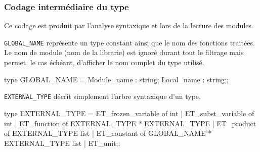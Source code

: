 \subsubsection{Codage interm{\'e}diaire du type}

Ce codage est produit par l'analyse syntaxique et lors de la lecture
des modules.

\verb$GLOBAL_NAME$ repr{\'e}sente un type constant ainsi que
le nom des fonctions trait{\'e}es. Le nom de module (nom de la librarie)
est ignor{\'e} durant tout le filtrage mais permet, le cas {\'e}ch{\'e}ant,
d'afficher le nom complet du type utilis{\'e}.

\begin{caml_code}
type GLOBAL_NAME =
  {Module_name : string;
   Local_name : string};;
\end{caml_code}

\verb$EXTERNAL_TYPE$ d{\'e}crit simplement l'arbre syntaxique d'un type.

\begin{caml_code}
type EXTERNAL_TYPE =
    ET_frozen_variable of int
  | ET_subst_variable of int
  | ET_function of EXTERNAL_TYPE * EXTERNAL_TYPE
  | ET_product of EXTERNAL_TYPE list
  | ET_constant of GLOBAL_NAME * EXTERNAL_TYPE list
  | ET_unit;;
\end{caml_code}
